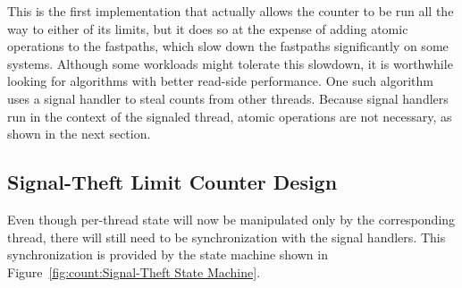This is the first implementation that actually allows the counter to
be run all the way to either of its limits, but it does so at the
expense of adding atomic operations to the fastpaths, which slow down
the fastpaths significantly on some systems.
Although some workloads might tolerate this slowdown, it is worthwhile
looking for algorithms with better read-side performance.
One such algorithm uses a signal handler to steal counts from other
threads.
Because signal handlers run in the context of the signaled thread,
atomic operations are not necessary, as shown in the next section.

\QuickQuizEnd

\subsection{Signal-Theft Limit Counter Design}
\label{sec:count:Signal-Theft Limit Counter Design}

Even though per-thread state will now be manipulated only by the
corresponding thread, there will still need to be synchronization
with the signal handlers.
This synchronization is provided by the state machine shown in
Figure~\ref{fig:count:Signal-Theft State Machine}.

